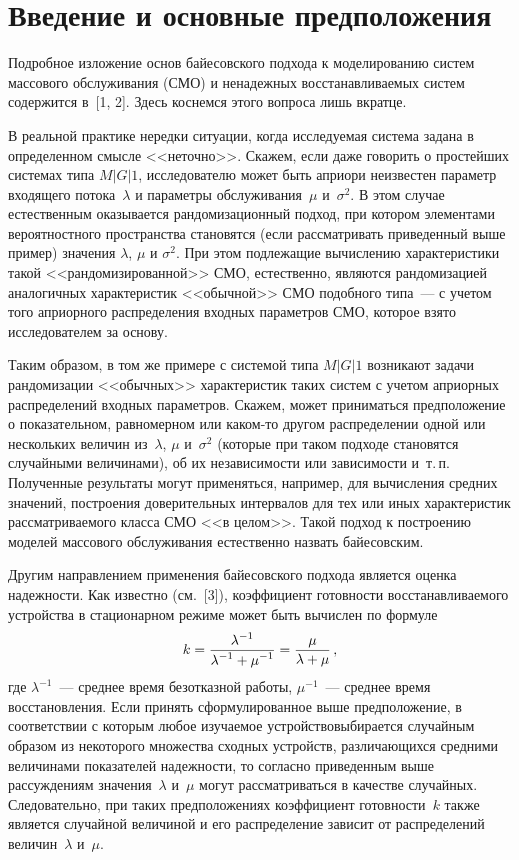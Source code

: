       \begin{multicols}{2}

      \label{st\stat}

\section{Введение и основные предположения}

Подробное изложение основ байесовского подхода к моделированию систем массового обслуживания (СМО) и ненадежных
восстанавливаемых сис\-тем содержится в~[1, 2]. Здесь коснемся этого вопроса лишь вкратце.

В реальной практике нередки ситуации, когда исследуемая система задана в определенном смысле <<неточно>>. Скажем, если
даже говорить о простейших системах типа $M\vert G\vert 1$, исследователю может быть априори неизвестен параметр входящего 
потока~$\lambda$ и параметры обслуживания~$\mu$ и~$\sigma^2$. В этом случае естественным оказывается рандомизационный подход,
при котором элементами вероятностного пространства становятся (если рассматривать приведенный выше пример) значения
$\lambda$, $\mu$ и $\sigma^2$. При этом подлежащие вычислению характеристики такой <<рандомизированной>> СМО,
естественно, являются рандомизацией аналогичных характеристик <<обычной>> СМО подобного типа~--- с учетом того
априорного распределения входных па\-ра\-мет\-ров СМО, которое взято исследователем за основу.

Таким образом, в том же примере с системой типа $M\vert G\vert 1$ возникают задачи рандомизации 
<<обычных>> характеристик таких
систем с учетом априорных распределений входных параметров. Скажем, может приниматься предположение о показательном,
равномерном или каком-то другом распределении одной или нескольких величин из~$\lambda$, $\mu$ и~$\sigma^2$ (которые
при таком подходе становятся случайными величинами), об их независимости или зависимости и~т.\,п. Полученные результаты
могут применяться, например, для вычисления средних значений, построения доверительных интервалов для тех или иных
характеристик рассматриваемого класса СМО <<в целом>>. Такой подход к по\-стро\-ению моделей массового обслуживания
естественно назвать байесовским.

Другим направлением применения байесовского подхода является оценка надежности. Как известно (см.~[3]), коэффициент
готовности восстанавливаемого устройства в стационарном режиме может быть вычислен по формуле
$$
k=\displaystyle\frac{\displaystyle \lambda^{-1}\mathstrut}{\displaystyle \lambda^{-1}+\mu^{-1}\mathstrut}=\displaystyle\frac{\displaystyle \mu\mathstrut}{\displaystyle \lambda+\mu\mathstrut}\,,
$$
где $\lambda^{-1}$~--- среднее время безотказной работы, $\mu^{-1}$~--- среднее время восстановления. Если принять
сформулированное выше предположение, в соответствии с которым любое изучаемое устройство\linebreak выбирается случайным образом
из некоторого множества сходных устройств, различающихся средними величинами показателей надежности, то согласно
приведенным выше рассуждениям значения~$\lambda$ и~$\mu$ могут рассматриваться в качестве случайных.
Следовательно, при таких предположениях коэффициент готовности~$k$ также является случайной величиной и его
распределение зависит от распределений величин~$\lambda$ и~$\mu$.


\end{multicols}
